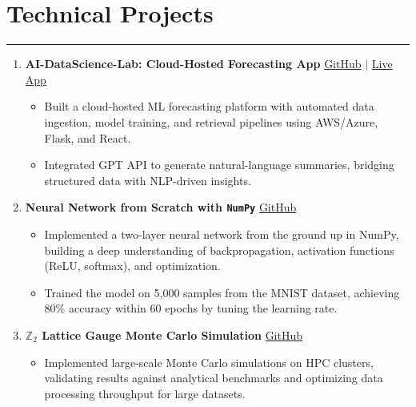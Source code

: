 \documentclass[11pt]{article}
\begin{document}
\section*{Technical Projects}
\hrule
\vspace{-0.3em}
\begin{enumerate}
    \item \textbf{AI-DataScience-Lab: Cloud-Hosted Forecasting App}  
    \hfill \href{https://github.com/Hariprashad-Ravikumar/AI-DataScience-Lab}{GitHub} $|$ \href{https://hariprashad-ravikumar.github.io/AI-DataScience-Lab}{Live App} \\
    \vspace{-2em}
    \begin{itemize}
    \item Built a cloud-hosted ML forecasting platform with automated data ingestion, model training, and retrieval pipelines using AWS/Azure, Flask, and React.
    \vspace{-0.5em}
    \item Integrated GPT API to generate natural-language summaries, bridging structured data with NLP-driven insights.
    \end{itemize}
    

    \item \textbf{Neural Network from Scratch with \texttt{NumPy}}  
    \hfill \href{https://github.com/Hariprashad-Ravikumar/Neural-Network-from-Scratch-with-NumPy}{GitHub} \\
    \vspace{-2em}
    \begin{itemize}
        \item Implemented a two-layer neural network from the ground up in NumPy, building a deep understanding of backpropagation, activation functions (ReLU, softmax), and optimization.
        \vspace{-0.5em}
        \item Trained the model on 5,000 samples from the MNIST dataset, achieving $80\%$ accuracy within 60 epochs by tuning the learning rate.
    \end{itemize}

    \item \textbf{$\mathbb{Z}_2$ Lattice Gauge Monte Carlo Simulation}  
    \hfill \href{https://github.com/Hariprashad-Ravikumar/Z2_LatticeGauge_Monte_Carlo_Simulation}{GitHub} \\
    \vspace{-2em}
    \begin{itemize}
         \item Implemented large-scale Monte Carlo simulations on HPC clusters, validating results against analytical benchmarks and optimizing data processing throughput for large datasets.
    \end{itemize}
\end{enumerate}
\end{document}
